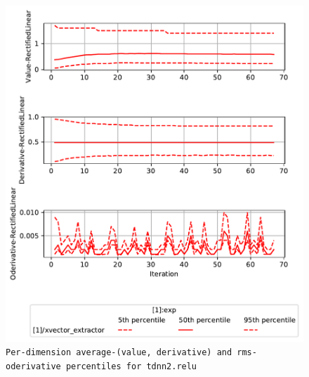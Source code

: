 \documentclass[prl,10pt,twocolumn]{revtex4}
\begin{document}
\newpage
\begin{figure}[h]
  \begin{center}
    \caption{\texttt{Per-dimension average-(value, derivative) and rms-oderivative percentiles for tdnn2.relu}}
    \includegraphics[width=\textwidth]{exp/xvector_extractor/report/nonlinstats_tdnn2_dot_relu.pdf}
  \end{center}
\end{figure}
\clearpage
\end{document}
